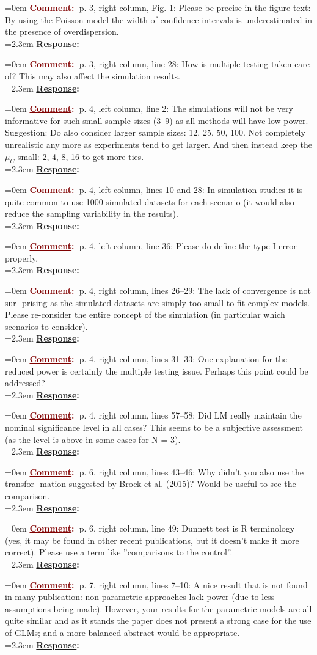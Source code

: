\documentclass[12pt]{article}
\newcommand{\comment}[0]{\vspace{1em} \noindent \hangindent=0em \textbf{\textcolor{Maroon}{\uline{Comment}:~}}}
\newcommand{\response}[0]{\\\vspace{0.1em} \hangindent=2.3em \textbf{\textcolor{NavyBlue}{\uline{Response}:~}}}
\begin{document}
\comment p. 3, right column, Fig. 1: Please be precise in the figure text: By using
the Poisson model the width of confidence intervals is underestimated
in the presence of overdispersion.
\response

\comment p. 3, right column, line 28: How is multiple testing taken care of? This
may also affect the simulation results.
\response

\comment p. 4, left column, line 2: The simulations will not be very informative
for such small sample sizes (3–9) as all methods will have low power.
Suggestion: Do also consider larger sample sizes: 12, 25, 50, 100. Not
completely unrealistic any more as experiments tend to get larger. And
then instead keep the $\mu_C$ small: 2, 4, 8, 16 to get more ties.
\response

\comment p. 4, left column, lines 10 and 28: In simulation studies it is quite
common to use 1000 simulated datasets for each scenario (it would
also reduce the sampling variability in the results).
\response

\comment p. 4, left column, line 36: Please do define the type I error properly.
\response

\comment p. 4, right column, lines 26–29: The lack of convergence is not sur-
prising as the simulated datasets are simply too small to fit complex
models. Please re-consider the entire concept of the simulation (in
particular which scenarios to consider).
\response

\comment p. 4, right column, lines 31–33: One explanation for the reduced power
is certainly the multiple testing issue. Perhaps this point could be
addressed?
\response

\comment p. 4, right column, lines 57–58: Did LM really maintain the nominal
significance level in all cases? This seems to be a subjective assessment
(as the level is above in some cases for N = 3).
\response

\comment p. 6, right column, lines 43–46: Why didn’t you also use the transfor-
mation suggested by Brock et al. (2015)? Would be useful to see the
comparison.
\response

\comment p. 6, right column, line 49: Dunnett test is R terminology (yes, it
may be found in other recent publications, but it doesn’t make it more
correct). Please use a term like ”comparisons to the control”.
\response

\comment p. 7, right column, lines 7–10: A nice result that is not found in
many publication: non-parametric approaches lack power (due to less
assumptions being made). However, your results for the parametric
models are all quite similar and as it stands the paper does not present
a strong case for the use of GLMs; and a more balanced abstract would
be appropriate.
\response
\end{document}
